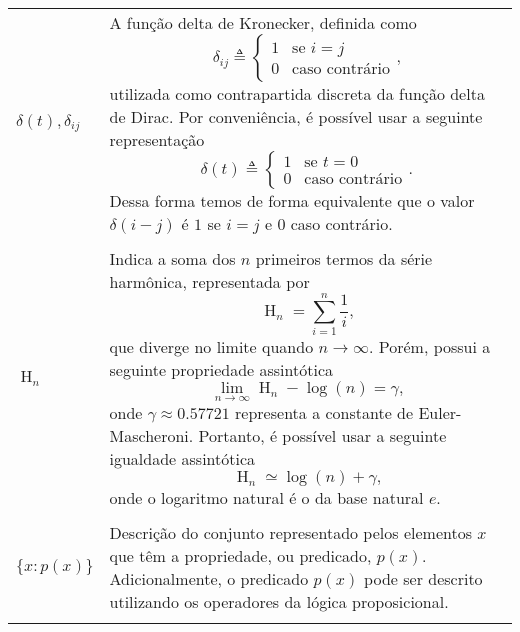 \begin{longtable}{p{1in}p{4.5in}}
$\delta(t),\delta_{ij}$ \dotfill &
\index{delta de Kronecker}%
\index{$\delta(t),\delta_{ij}$}%
A função delta de Kronecker, definida como
\begin{equation*}
\delta_{ij} \triangleq
\left\{
\begin{array}{cl}
    1         & \text{se } i = j \\
    0         & \text{caso contrário}
\end{array}
\right.\text{,}
\end{equation*}
utilizada como contrapartida discreta da função delta de Dirac.
\index{delta de Dirac}%
Por conveniência, é possível usar a seguinte representação
\begin{equation*}
\delta(t) \triangleq
\left\{
\begin{array}{cl}
    1         & \text{se } t = 0 \\
    0         & \text{caso contrário}
\end{array}
\right.\text{.}
\end{equation*}
Dessa forma temos de forma equivalente que o valor $\delta(i - j)$ é $1$ se
$i=j$ e $0$ caso contrário.
\tabularnewline
\tabularnewline

$\operatorname{H}_n$ \dotfill &
\index{serie harmonica@série harmônica}%
\index{$\operatorname{H}_n$}%
Indica a soma dos $n$ primeiros termos da série harmônica, representada por
\begin{equation*}
\operatorname{H}_n = \sum_{i=1}^n \frac{1}{i}\text{,}
\end{equation*}
que diverge no limite quando $n \rightarrow \infty$.
Porém, possui a seguinte propriedade assintótica
\begin{equation*}
\lim_{n \rightarrow \infty}\operatorname{H}_n - \log(n) = \gamma\text{,}
\end{equation*}
onde $\gamma\approx 0.57721$ representa a constante de Euler-Mascheroni.
\index{constante de Euler-Mascheroni}%
Portanto, é possível usar a seguinte igualdade assintótica
\begin{equation*}
\operatorname{H}_n \simeq \log(n) + \gamma\text{,}
\end{equation*}
onde o logaritmo natural é o da base natural $e$.
\tabularnewline
\tabularnewline

$\{x : p(x)\}$ \dotfill &
Descrição do conjunto representado pelos elementos $x$ que têm a propriedade,
ou predicado, $p(x)$.
Adicionalmente, o predicado $p(x)$ pode ser descrito utilizando os operadores
da lógica proposicional.
\tabularnewline
\tabularnewline


\end{longtable}
